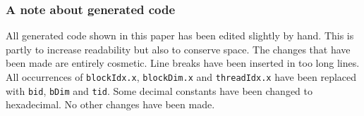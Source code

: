 \subsubsection{A note about generated code} 

All generated code shown in this paper has been edited slightly by hand. This 
is partly to increase readability but also to conserve space. The changes 
that have been made are entirely cosmetic. Line breaks have been inserted in too
long lines. All occurrences of {\tt blockIdx.x}, {\tt blockDim.x} and 
{\tt threadIdx.x} have been replaced with {\tt bid}, {\tt bDim} and {\tt tid}.
Some decimal constants have been changed to hexadecimal.
No other changes have been made. 


